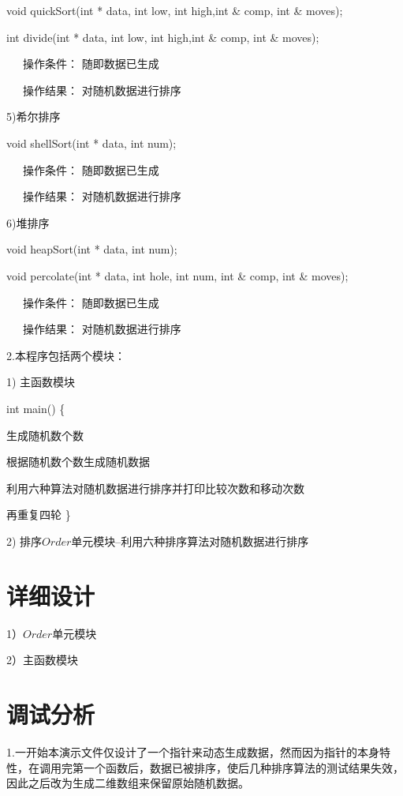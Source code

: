 \documentclass[paper=a4,UTF8,fontsize=11pt]{scrartcl} %
\numberwithin{equation}{section} %
\numberwithin{figure}{section} %
\numberwithin{table}{section} %
\begin{document}
void quickSort(int * data, int low, int high,int \& comp, int \& moves);

int divide(int * data, int low, int high,int \& comp, int \& moves);

\qquad \qquad \quad \ \ \ 操作条件： 随即数据已生成

\qquad \qquad \quad \ \ \ 操作结果： 对随机数据进行排序

5)希尔排序

void shellSort(int * data, int num);

\qquad \qquad \quad \ \ \ 操作条件： 随即数据已生成

\qquad \qquad \quad \ \ \ 操作结果： 对随机数据进行排序

6)堆排序

void heapSort(int * data, int num);

void percolate(int * data, int hole, int num, int \& comp, int \& moves);

\qquad \qquad \quad \ \ \ 操作条件： 随即数据已生成

\qquad \qquad \quad \ \ \ 操作结果： 对随机数据进行排序

\newpage

2.本程序包括两个模块：

1)  主函数模块

\qquad int main() \{

\qquad \quad 生成随机数个数

\qquad \quad 根据随机数个数生成随机数据

\qquad \quad 利用六种算法对随机数据进行排序并打印比较次数和移动次数

\qquad \quad 再重复四轮       
\}
       
2)  排序$Order$单元模块--利用六种排序算法对随机数据进行排序

\section{详细设计}
1）$Order$单元模块


2）主函数模块


\vspace{0.3cm}
\section{调试分析}
1.一开始本演示文件仅设计了一个指针来动态生成数据，然而因为指针的本身特性，在调用完第一个函数后，数据已被排序，使后几种排序算法的测试结果失效，因此之后改为生成二维数组来保留原始随机数据。
\end{document}
